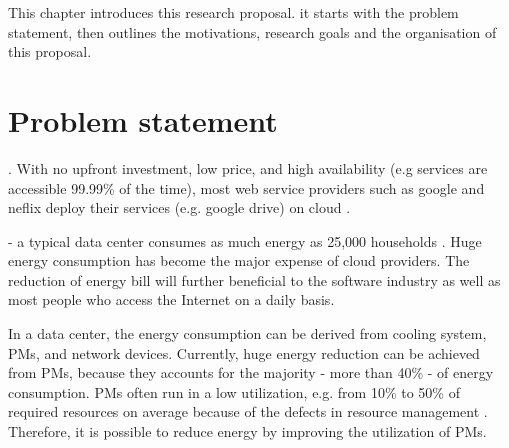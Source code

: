 This chapter introduces this research proposal. it starts with the problem statement, then outlines the motivations, research goals and the organisation of this proposal.

\section{Problem statement}

. With no upfront investment, low price, and high availability (e.g services are accessible 99.99\% of the time), most web service providers such as google and neflix deploy their services (e.g. google drive) on cloud \cite{adhikari:2012uq}. 

 - a typical data center consumes as much energy as 25,000 households \cite{dayarathna:2016ua}. Huge energy consumption has become the major expense of cloud providers. The reduction of energy bill will further beneficial to the software industry as well as most people who access the Internet on a daily basis.

 In a data center, the energy consumption can be derived from cooling system, PMs, and network devices. Currently, huge energy reduction can be achieved from PMs, because they accounts for the majority - more than 40\% - of energy consumption. PMs often run in a low utilization, e.g. from 10\% to 50\% of required resources on average because of the defects in resource management \cite{Barroso:2007jt, Shen:2015hm}. Therefore, it is possible to reduce energy by improving the utilization of PMs.

